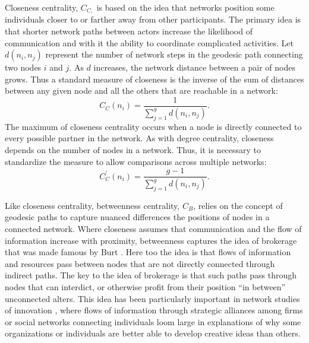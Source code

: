 \documentclass[]{krantz}
\begin{document}
Closeness centrality, \(C_{C,}\) is based on the idea that networks
position some individuals closer to or farther away from other
participants. The primary idea is that shorter network paths between
actors increase the likelihood of communication and with it the ability
to coordinate complicated activities. Let \(d(n_{i}, n_{j})\) represent
the number of network steps in the geodesic path connecting two nodes
\(i\) and \(j\). As \(d\) increases, the network distance between a pair
of nodes grows. Thus a standard measure of closeness is the inverse of
the sum of distances between any given node and all the others that are
reachable in a network: \[C_C(n_i) = \frac{1}{\sum_{j=1}^gd(n_i,n_j)}.\]
The maximum of closeness centrality occurs when a node is directly
connected to every possible partner in the network. As with degree
centrality, closeness depends on the number of nodes in a network. Thus,
it is necessary to standardize the measure to allow comparisons across
multiple networks:
\[C_C^{\prime}(n_i)=\frac{g-1}{\sum_{j=1}^gd(n_i,n_j)}.\]

Like closeness centrality, betweenness centrality, \(C_{B}\), relies on
the concept of geodesic paths to capture nuanced differences the
positions of nodes in a connected network. Where closeness assumes that
communication and the flow of information increase with proximity,
betweenness captures the idea of brokerage that was made famous by Burt
\citeyearpar{burt1993social}. Here too the idea is that flows of
information and resources pass between nodes that are not directly
connected through indirect paths. The key to the idea of brokerage is
that such paths pass through nodes that can interdict, or otherwise
profit from their position ``in between'' unconnected alters. This idea
has been particularly important in network studies of innovation
\citep{owen2003expanding, burt2004structural}, where flows of
information through strategic alliances among firms or social networks
connecting individuals loom large in explanations of why some
organizations or individuals are better able to develop creative ideas
than others.
\end{document}
